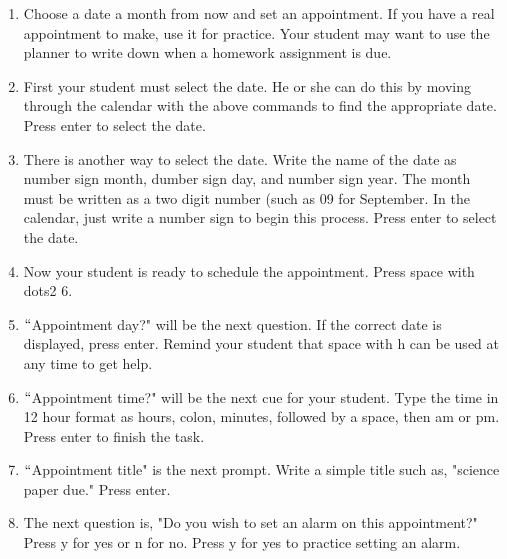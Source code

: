 \documentclass[10pt,letterpaper,twoside]{report}
\begin{document}
{{{{\begin{enumerate}
\begin{enumerate}
		      \item Use space with dot2 or space with dot5 to move through the calendar by week.
		            
		      \item In order to move by month, use space with dot1 or space with dot4.
		            
		      \item Moving a year at a time can be accomplished by using space with dots2 3 or space with dots5 6.
		            
		            
	      \end{enumerate}
	\item Choose a date a month from now and set an appointment.  If you have a real appointment to make, use it for practice.  Your student may want to use the planner to write down when a homework assignment is due.
	      
	\item First your student must select the date.  He or she can do this by moving through the calendar with the above commands to find the appropriate date. Press enter to select the date.
	      
	\item There is another way to select the date.  Write the name of the date as number sign month, dumber sign day, and number sign year.  The month must be written as a two digit number (such as 09 for September.  In the calendar, just write a number sign to begin this process.  Press enter to select the date.
	      
	\item Now your student is ready to schedule the appointment.  Press space with dots2 6.
	      
	\item $``$Appointment day?" will be the next question.  If the correct date is displayed, press enter.  Remind your student that space with h can be used at any time to get help.
	      
	\item $``$Appointment time?" will be the next cue for your student.  Type the time in 12 hour format as hours, colon, minutes, followed by a space, then am or pm.  Press enter to finish the task.
	      
	\item $``$Appointment title" is the next prompt.  Write a simple title such as, "science paper due." Press enter.
	      
	\item The next question is, "Do you wish to set an alarm on this appointment?" Press y for yes or n for no.  Press y for yes to practice setting an alarm.
	      

\end{enumerate}}}}}
\end{document}
